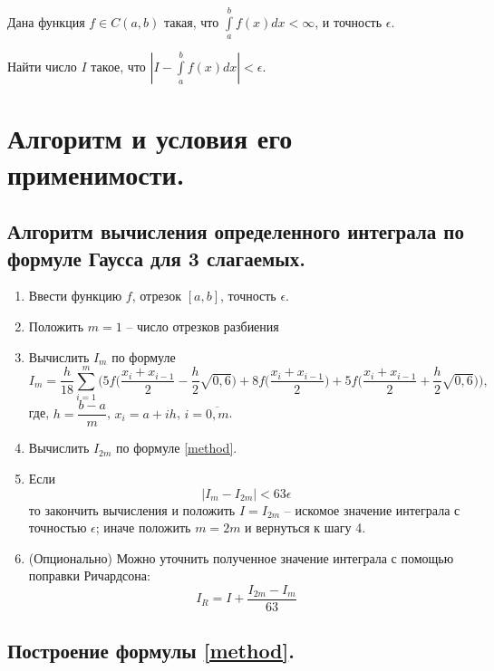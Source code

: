 \documentclass[a4paper, 12pt]{article}
\begin{document}
	Дана функция $f\in C(a,b)$ такая, что $\int\limits_a^bf(x)dx<\infty$, и точность $\epsilon$. 
	
	Найти число $I$ такое, что $|I-\int\limits_a^bf(x)dx|<\epsilon$.
	
	\section{Алгоритм и условия его применимости.}
	
	\subsection{Алгоритм вычисления определенного интеграла по формуле Гаусса для 3 слагаемых.}
	\label{alghorithm}
	
	\begin{enumerate}
		\item Ввести функцию $f$, отрезок $[a,b]$, точность $\epsilon$.
		\item Положить $m=1$ -- число отрезков разбиения
		\item Вычислить $I_m$ по формуле
		\begin{equation} \label{method}
			I_m=\frac{h}{18}\sum\limits_{i=1}^{m}\bigg(5f\bigg(\frac{x_i+x_{i-1}}{2}-\frac{h}{2}\sqrt{0,6}\bigg)+8f\bigg(\frac{x_i+x_{i-1}}{2}\bigg)+5f\bigg(\frac{x_i+x_{i-1}}{2}+\frac{h}{2}\sqrt{0,6}\bigg)\bigg),
		\end{equation}
		где, $h=\dfrac{b-a}{m}$, $x_i=a+ih$, $i=\overline{0,m}$.
		\item Вычислить $I_{2m}$ по формуле \eqref{method}.
		\item Если
		\begin{equation} \label{runge}
			|I_m-I_{2m}|<63\epsilon
		\end{equation}
		то закончить вычисления и положить $I=I_{2m}$ -- искомое значение интеграла с точностью $\epsilon$; иначе положить $m=2m$ и вернуться к шагу 4.
		\item (Опционально) Можно уточнить полученное значение интеграла с помощью поправки Ричардсона:
		\begin{equation}
			I_R=I+\frac{I_{2m}-I_m}{63}
		\end{equation}
	\end{enumerate}

	\subsection{Построение формулы \eqref{method}.}
	
\end{document}

